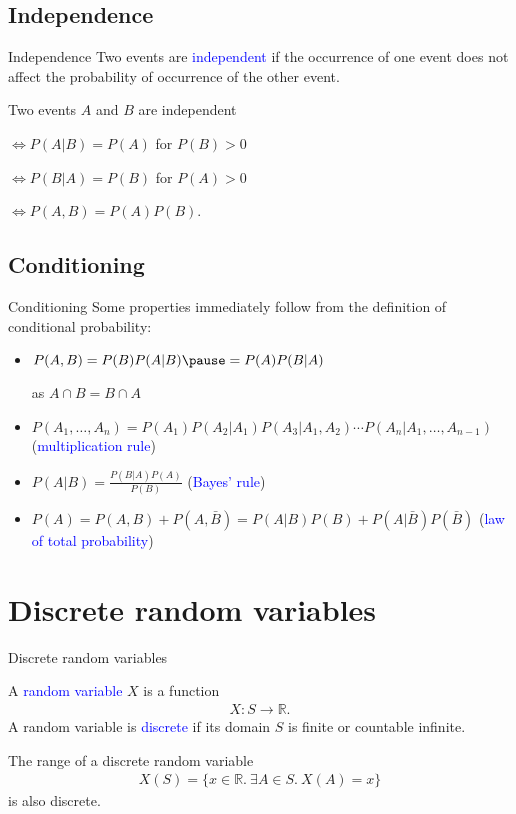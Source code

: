 \documentclass{beamer}
\def\padding{\vspace{0.5cm}}
\def\b{\textcolor{blue}}
\begin{document}
\subsection{Independence}
\begin{frame}{Independence}
    Two events are \b{independent} if the occurrence of one event does not affect the probability of occurrence of the other event.\pause\par\padding
    Two events $A$ and $B$ are independent\par
    $\iff P(A|B) = P(A)$ for $P(B) > 0$\pause\par
    $\iff P(B|A) = P(B)$ for $P(A) > 0$\pause\par
    $\iff P(A,B) = P(A) P(B)$.
\end{frame}

\subsection{Conditioning}
\begin{frame}{Conditioning}
    Some properties immediately follow from the definition of conditional probability:\pause
    \begin{itemize}
        \item $P(A,B) = P(B) P(A|B)\pause = P(A) P(B|A)$\par as $A \cap B = B \cap A$\pause
        \item $P(A_1, \dots, A_n) = P(A_1) P(A_2|A_1) P(A_3|A_1, A_2) \cdots P(A_n|A_1, \dots, A_{n-1})$ (\b{multiplication rule})\pause
        \item $P(A|B) = \frac{P(B|A) P(A)}{P(B)}$ (\b{Bayes' rule})\pause
        \item $P(A) = P(A,B) + P(A,\bar{B}) = P(A|B) P(B) + P(A|\bar{B}) P(\bar{B})$ (\b{law of total probability})
    \end{itemize}
\end{frame}

\section{Discrete random variables}
\begin{frame}{Discrete random variables}
    \begin{definition}
        A \b{random variable} $X$ is a function
        \begin{align*}
            X: S \to \mathbb{R}.
        \end{align*}\pause
        A random variable is \b{discrete} if its domain $S$ is finite or countable infinite.
    \end{definition}\pause\padding
    The range of a discrete random variable
    \begin{align*}
        X(S) = \{x \in \mathbb{R}.\ \exists A \in S.\ X(A) = x\}
    \end{align*}
    is also discrete.
\end{frame}
\end{document}
